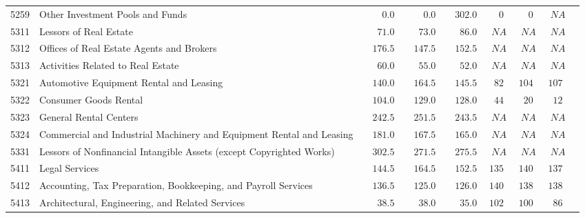 \documentclass[9pt, oneside]{article}   	%
\begin{document}
\begin{longtable}{lp{3.5 in}ccccccc}
5259  & Other Investment Pools and Funds & $\phantom{0000}0.0$ & $\phantom{0000}0.0$ & $\phantom{00}302.0$ & $\phantom{00}0$ & $\phantom{00}0$ & $\phantom{0}NA$ \\
5311  & Lessors of Real Estate & $\phantom{000}71.0$ & $\phantom{000}73.0$ & $\phantom{000}86.0$ & $\phantom{0}NA$ & $\phantom{0}NA$ & $\phantom{0}NA$ \\
5312  & Offices of Real Estate Agents and Brokers & $\phantom{00}176.5$ & $\phantom{00}147.5$ & $\phantom{00}152.5$ & $\phantom{0}NA$ & $\phantom{0}NA$ & $\phantom{0}NA$ \\
5313  & Activities Related to Real Estate & $\phantom{000}60.0$ & $\phantom{000}55.0$ & $\phantom{000}52.0$ & $\phantom{0}NA$ & $\phantom{0}NA$ & $\phantom{0}NA$ \\
5321  & Automotive Equipment Rental and Leasing & $\phantom{00}140.0$ & $\phantom{00}164.5$ & $\phantom{00}145.5$ & $\phantom{0}82$ & $104$ & $107$ \\
5322  & Consumer Goods Rental & $\phantom{00}104.0$ & $\phantom{00}129.0$ & $\phantom{00}128.0$ & $\phantom{0}44$ & $\phantom{0}20$ & $\phantom{0}12$ \\
5323  & General Rental Centers & $\phantom{00}242.5$ & $\phantom{00}251.5$ & $\phantom{00}243.5$ & $\phantom{0}NA$ & $\phantom{0}NA$ & $\phantom{0}NA$ \\
5324  & Commercial and Industrial Machinery and Equipment Rental and Leasing & $\phantom{00}181.0$ & $\phantom{00}167.5$ & $\phantom{00}165.0$ & $\phantom{0}NA$ & $\phantom{0}NA$ & $\phantom{0}NA$ \\
5331  & Lessors of Nonfinancial Intangible Assets (except Copyrighted Works) & $\phantom{00}302.5$ & $\phantom{00}271.5$ & $\phantom{00}275.5$ & $\phantom{0}NA$ & $\phantom{0}NA$ & $\phantom{0}NA$ \\
5411  & Legal Services & $\phantom{00}144.5$ & $\phantom{00}164.5$ & $\phantom{00}152.5$ & $135$ & $140$ & $137$ \\
5412  & Accounting, Tax Preparation, Bookkeeping, and Payroll Services & $\phantom{00}136.5$ & $\phantom{00}125.0$ & $\phantom{00}126.0$ & $140$ & $138$ & $138$ \\
5413  & Architectural, Engineering, and Related Services & $\phantom{000}38.5$ & $\phantom{000}38.0$ & $\phantom{000}35.0$ & $102$ & $100$ & $\phantom{0}86$ \\

\end{longtable}
\end{document}
